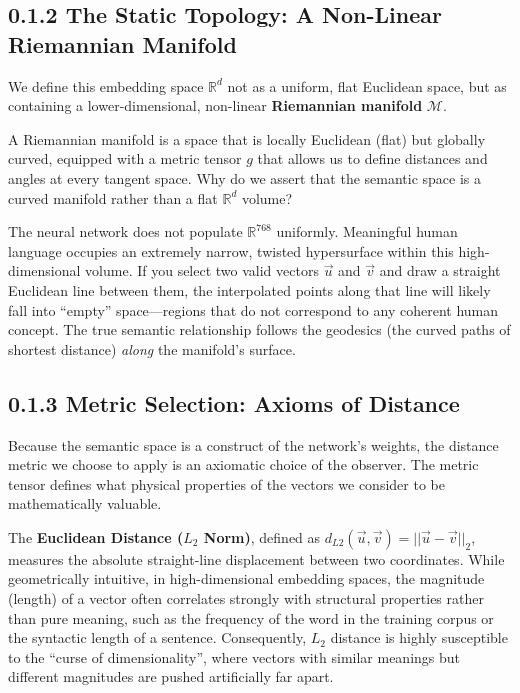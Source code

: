 \subsection*{0.1.2 The Static Topology: A Non-Linear Riemannian Manifold}

We define this embedding space $\mathbb{R}^d$ not as a uniform, flat Euclidean space, but as containing a lower-dimensional, non-linear \textbf{Riemannian manifold} $\mathcal{M}$.

A Riemannian manifold is a space that is locally Euclidean (flat) but globally curved, equipped with a metric tensor $g$ that allows us to define distances and angles at every tangent space. Why do we assert that the semantic space is a curved manifold rather than a flat $\mathbb{R}^d$ volume?

The neural network does not populate $\mathbb{R}^{768}$ uniformly. Meaningful human language occupies an extremely narrow, twisted hypersurface within this high-dimensional volume. If you select two valid vectors $\vec{u}$ and $\vec{v}$ and draw a straight Euclidean line between them, the interpolated points along that line will likely fall into ``empty'' space—regions that do not correspond to any coherent human concept. The true semantic relationship follows the geodesics (the curved paths of shortest distance) \textit{along} the manifold's surface.


\subsection*{0.1.3 Metric Selection: Axioms of Distance}

Because the semantic space is a construct of the network's weights, the distance metric we choose to apply is an axiomatic choice of the observer. The metric tensor defines what physical properties of the vectors we consider to be mathematically valuable.

The \textbf{Euclidean Distance ($L_2$ Norm)}, defined as $d_{L2}(\vec{u}, \vec{v}) = ||\vec{u} - \vec{v}||_2$, measures the absolute straight-line displacement between two coordinates. While geometrically intuitive, in high-dimensional embedding spaces, the magnitude (length) of a vector often correlates strongly with structural properties rather than pure meaning, such as the frequency of the word in the training corpus or the syntactic length of a sentence. Consequently, $L_2$ distance is highly susceptible to the ``curse of dimensionality'', where vectors with similar meanings but different magnitudes are pushed artificially far apart.

